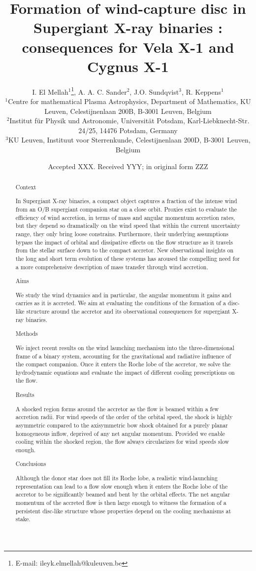 \documentclass[a4paper,fleqn,usenatbib]{mnras}
\title[Disc formation in SgXB]{Formation of wind-capture disc in Supergiant X-ray binaries :\\ consequences for Vela X-1 and Cygnus X-1}
\author[I. El Mellah, A. A. C. Sander, J.O. Sundqvist, R. Keppens]{
I. El Mellah$^{1}$\thanks{E-mail: ileyk.elmellah@kuleuven.be},
A. A. C. Sander$^{2}$,
J.O. Sundqvist$^{3}$,
R. Keppens$^{1}$
\\
$^{1}$Centre for mathematical Plasma Astrophysics, Department of Mathematics, KU Leuven, Celestijnenlaan 200B, B-3001 Leuven, Belgium\\
$^{2}$Institut f{\"u}r Physik und Astronomie, Universit{\"a}t Potsdam, Karl-Liebknecht-Str. 24/25, 14476 Potsdam, Germany\\
$^{3}$KU Leuven, Instituut voor Sterrenkunde, Celestijnenlaan 200D, B-3001 Leuven, Belgium
}
\date{Accepted XXX. Received YYY; in original form ZZZ}
\begin{document}
\label{firstpage}
\pagerange{\pageref{firstpage}--\pageref{lastpage}}
\maketitle

\begin{abstract}

Context

In Supergiant X-ray binaries, a compact object captures a fraction of the intense wind from an O/B supergiant companion star on a close orbit. Proxies exist to evaluate the efficiency of wind accretion, in terms of mass and angular momentum accretion rates, but they depend so dramatically on the wind speed that within the current uncertainty range, they only bring loose constrains. Furthermore, their underlying assumptions bypass the impact of orbital and dissipative effects on the flow structure as it travels from the stellar surface down to the compact accretor. New observational insights on the long and short term evolution of these systems has aroused the compelling need for a more comprehensive description of mass transfer through wind accretion.

Aims

We study the wind dynamics and in particular, the angular momentum it gains and carries as it is accreted. We aim at evaluating the conditions of the formation of a disc-like structure around the accretor and its observational consequences for supergiant X-ray binaries. 

Methods

We inject recent results on the wind launching mechanism into the three-dimensional frame of a binary system, accounting for the gravitational and radiative influence of the compact companion. Once it enters the Roche lobe of the accretor, we solve the hydrodynamic equations and evaluate the impact of different cooling prescriptions on the flow.

Results

A shocked region forms around the accretor as the flow is beamed within a few accretion radii. For wind speeds of the order of the orbital speed, the shock is highly asymmetric compared to the axisymmetric bow shock obtained for a purely planar homogeneous inflow, deprived of any net angular momentum. Provided we enable cooling within the shocked region, the flow always circularizes for wind speeds slow enough.

Conclusions

Although the donor star does not fill its Roche lobe, a realistic wind-launching representation can lead to a flow slow enough when it enters the Roche lobe of the accretor to be significantly beamed and bent by the orbital effects. The net angular momentum of the accreted flow is then large enough to witness the formation of a persistent disc-like structure whose properties depend on the cooling mechanisms at stake.

\end{abstract}
\end{document}

